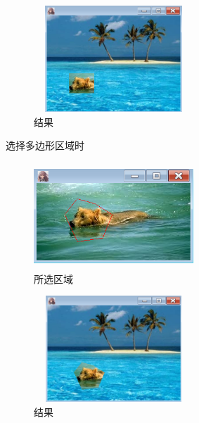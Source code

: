 \documentclass{article}
\begin{document}
	\begin{figure}[H]
	\begin{center}
		
		\includegraphics[width=6cm,height=4cm]{rect2}
		
		\caption{结果} \label{rect2.label}
	\end{center}
\end{figure}

  选择多边形区域时

\begin{figure}[H]
	\begin{center}
		
		\includegraphics[width=6cm,height=4cm]{poly1}
		
		\caption{所选区域} \label{poly1.label}
	\end{center}
\end{figure}

\begin{figure}[H]
	\begin{center}
		
		\includegraphics[width=6cm,height=4cm]{poly2}
		
		\caption{结果} \label{poly2.label}
	\end{center}
\end{figure}
\end{document}
